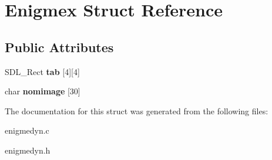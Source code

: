 \hypertarget{structEnigmex}{}\section{Enigmex Struct Reference}
\label{structEnigmex}
\subsection*{Public Attributes}
\begin{DoxyCompactItemize}
\item 
\mbox{\label{structEnigmex_a8614f4b442356e05b40439cd99b6c264}} 
S\+D\+L\+\_\+\+Rect {\bfseries tab} \mbox{[}4\mbox{]}\mbox{[}4\mbox{]}
\item 
\mbox{\label{structEnigmex_a3d381a1d84fc00ab3e9edb2964b38af0}} 
char {\bfseries nomimage} \mbox{[}30\mbox{]}
\end{DoxyCompactItemize}


The documentation for this struct was generated from the following files\+:\begin{DoxyCompactItemize}
\item 
enigmedyn.\+c\item 
enigmedyn.\+h\end{DoxyCompactItemize}
